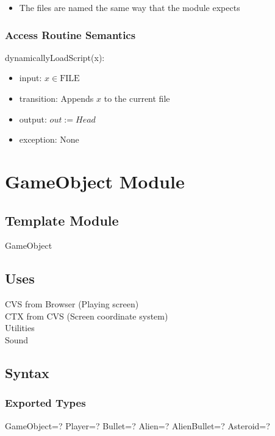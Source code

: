 \documentclass[12pt]{article}
\begin{document}
\begin{itemize}
    \item The files are named the same way that the module expects
\end{itemize}

\subsubsection* {Access Routine Semantics}

dynamicallyLoadScript(x):
\begin{itemize}
    \item input: $x \in \mbox{FILE}$
    \item transition: Appends $x$ to the current file
    \item output: $out := Head$
    \item exception: None
\end{itemize}


\newpage

\section*{GameObject Module}

\subsection*{Template Module}

GameObject

\subsection*{Uses}

CVS from Browser (Playing screen)\\
CTX from CVS (Screen coordinate system)\\
Utilities\\
Sound\\

\subsection*{Syntax}

\subsubsection*{Exported Types}

GameObject=?
Player=?
Bullet=?
Alien=?
AlienBullet=?
Asteroid=?
\end{document}
